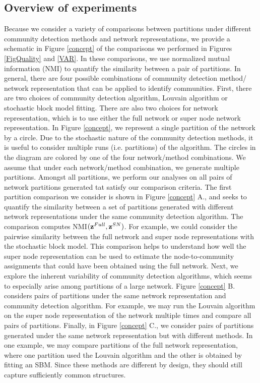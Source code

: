 \subsection{Overview of experiments}
Because we consider a variety of comparisons between partitions under different community detection methods and network representations, we provide a schematic in Figure \ref{concept} of the comparisons we performed in  Figures \ref{FigQuality} and \ref{VAR}. In these comparisons, we use normalized mutual information (NMI) to quantify the similarity between a pair of partitions.  In general, there are four possible combinations of community detection method/ network representation that can be applied to identify communities. First, there are two choices of community detection algorithm, Louvain algorithm or stochastic block model fitting. There are also two choices for network representation, which is to use either the full network or super node network representation. In Figure \ref{concept}, we represent a single partition of the network by a circle. Due to the stochastic nature of the community detection methods, it is useful to consider multiple runs (i.e. partitions) of the algorithm. The circles in the diagram are colored by one of the four network/method combinations. We assume that under each network/method combination, we generate multiple partitions. Amongst all partitions, we perform our analyses on all pairs of network partitions generated tat satisfy our comparison criteria. The first partition comparison we consider is shown in Figure \ref{concept} A., and seeks to quantify the similarity between a set of partitions generated with different network representations under the same community detection algorithm. The comparison computes NMI$({\bf z}^{Full},{\bf z}^{SN})$. For example, we could consider the pairwise similarity between the full network and super node representations with the stochastic block model. This comparison helps to understand how well the super node representation can be used to estimate the node-to-community assignments that could have been obtained using the full network. Next, we explore the inherent variability of community detection algorithms, which seems to especially arise among partitions of a large network. Figure \ref{concept} B. considers pairs of partitions under the same network representation and community detection algorithm. For example, we may run the Louvain algorithm on the super node representation of the network multiple times and compare all pairs of partitions. Finally, in Figure \ref{concept} C., we consider pairs of partitions generated under the same network representation but with different methods. In one example, we may compare partitions of the full network representation, where one partition used the Louvain algorithm and the other is obtained by fitting an SBM. Since these methods are different by design, they should still capture sufficiently common structures.


